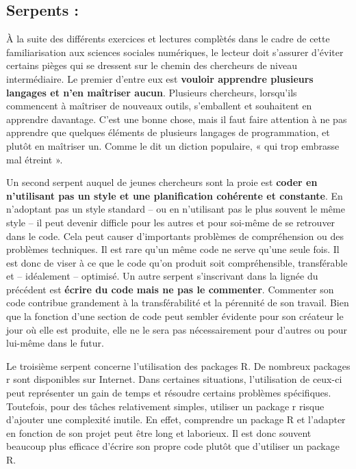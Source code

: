 \documentclass[
  letterpaper,
]{scrbook}
\begin{document}
\hypertarget{serpents-1}{%
\subsection{Serpents :}\label{serpents-1}}

À la suite des différents exercices et lectures complètés dans le cadre
de cette familiarisation aux sciences sociales numériques, le lecteur
doit s'assurer d'éviter certains pièges qui se dressent sur le chemin
des chercheurs de niveau intermédiaire. Le premier d'entre eux est
\textbf{vouloir apprendre plusieurs langages et n'en maîtriser aucun}.
Plusieurs chercheurs, lorsqu'ils commencent à maîtriser de nouveaux
outils, s'emballent et souhaitent en apprendre davantage. C'est une
bonne chose, mais il faut faire attention à ne pas apprendre que
quelques éléments de plusieurs langages de programmation, et plutôt en
maîtriser un. Comme le dit un diction populaire, « qui trop embrasse mal
étreint ».

Un second serpent auquel de jeunes chercheurs sont la proie est
\textbf{coder en n'utilisant pas un style et une planification cohérente
et constante}. En n'adoptant pas un style standard -- ou en n'utilisant
pas le plus souvent le même style -- il peut devenir difficle pour les
autres et pour soi-même de se retrouver dans le code. Cela peut causer
d'importants problèmes de compréhension ou des problèmes techniques. Il
est rare qu'un même code ne serve qu'une seule fois. Il est donc de
viser à ce que le code qu'on produit soit compréhensible, transférable
et -- idéalement -- optimisé. Un autre serpent s'inscrivant dans la
lignée du précédent est \textbf{écrire du code mais ne pas le
commenter}. Commenter son code contribue grandement à la transférabilité
et la pérennité de son travail. Bien que la fonction d'une section de
code peut sembler évidente pour son créateur le jour où elle est
produite, elle ne le sera pas nécessairement pour d'autres ou pour
lui-même dans le futur.

Le troisième serpent concerne l'utilisation des packages R. De nombreux
packages r sont disponibles sur Internet. Dans certaines situations,
l'utilisation de ceux-ci peut représenter un gain de temps et résoudre
certains problèmes spécifiques. Toutefois, pour des tâches relativement
simples, utiliser un package r risque d'ajouter une complexité inutile.
En effet, comprendre un package R et l'adapter en fonction de son projet
peut être long et laborieux. Il est donc souvent beaucoup plus efficace
d'écrire son propre code plutôt que d'utiliser un package R.
\end{document}
